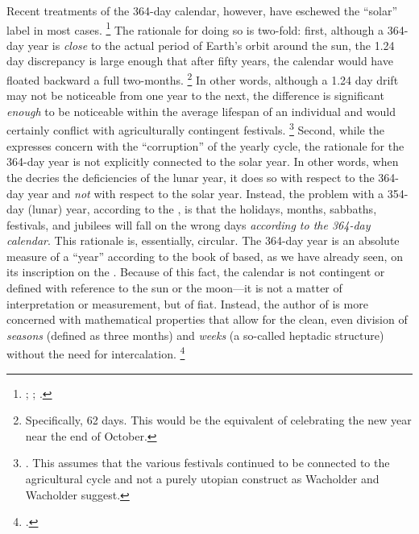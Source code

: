 Recent treatments of the 364-day calendar, however, have eschewed the ``solar'' label in most cases.%
    \footnote{%
        \cite[231]{glessmer_flint-vanderkam1999};
        \cite[80]{bendov_steele2011};
        \cite[438]{jacobus_brooke-hempel2018}.}
The rationale for doing so is two-fold: first, although a 364-day year is \emph{close} to the actual period of Earth's orbit around the sun, the 1.24 day discrepancy is large enough that after fifty years, the calendar would have floated backward a full two-months.%
    \footnote{%
        Specifically, 62 days. This would be the equivalent of celebrating the new year near the end of October.}
In other words, although a 1.24 day drift may not be noticeable from one year to the next, the difference is significant \emph{enough} to be noticeable within the average lifespan of an individual and would certainly conflict with agriculturally contingent festivals.%
    \footnote{%
        \Cite[28--37]{wacholder-wacholder_huca1995}. This assumes that the various festivals continued to be connected to the agricultural cycle and not a purely utopian construct as Wacholder and Wacholder suggest.}
Second, while the \ap expresses concern with the ``corruption'' of the yearly cycle, the rationale for the 364-day year is not explicitly connected to the solar year. In other words, when the \ap decries the deficiencies of the lunar year, it does so with respect to the 364-day year and \emph{not} with respect to the solar year. Instead, the problem with a 354-day (lunar) year, according to the \ap, is that the holidays, months, sabbaths, festivals, and jubilees will fall on the wrong days \emph{according to the 364-day calendar}. This rationale is, essentially, circular. The 364-day year is an absolute measure of a ``year'' according to the book of \jub based, as we have already seen, on its inscription on the \HT. Because of this fact, the calendar is not contingent or defined with reference to the sun or the moon---it is not a matter of interpretation or measurement, but of fiat. Instead, the author of \jub is more concerned with mathematical properties that allow for the clean, even division of \emph{seasons} (defined as three months) and \emph{weeks} (a so-called heptadic structure) without the need for intercalation.%
    \footnote{%
        \Cite[125]{bendov-saulnier_cbr2008}.}

